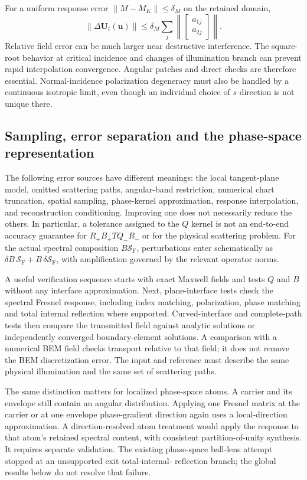 \documentclass[11pt,a4paper]{article}
\newcommand{\vct}[1]{\bm{#1}}
\newcommand{\SF}{\mathcal S_{\mathrm F}}
\numberwithin{equation}{section}
\begin{document}
For a uniform response error $\|M-M_K\|\le\delta_M$ on the retained domain,
\begin{equation}
 \|\Delta\vct U_t(\vct u)\|\le
 \delta_M\sum_j\left\|\begin{bmatrix}a_{1j}\\a_{2j}\end{bmatrix}\right\|.
 \label{eq:interpbound}
\end{equation}
Relative field error can be much larger near destructive interference.
The square-root behavior at critical incidence and changes of illumination
branch can prevent rapid interpolation convergence. Angular patches and direct
checks are therefore essential. Normal-incidence polarization degeneracy must
also be handled by a continuous isotropic limit, even though an individual
choice of $s$ direction is not unique there.

\subsection{Sampling, error separation and the phase-space representation}

The following error sources have different meanings: the local tangent-plane
model, omitted scattering paths, angular-band restriction, numerical chart
truncation, spatial sampling, phase-kernel approximation, response
interpolation, and reconstruction conditioning. Improving one does not
necessarily reduce the others. In particular, a tolerance assigned to the $Q$
kernel is not an end-to-end accuracy guarantee for $R_+B_+TQ_-R_-$ or for the physical
scattering problem. For the actual spectral composition $B\SF$, perturbations
enter schematically as $\delta B\,\SF+B\,\delta\SF$, with amplification governed
by the relevant operator norms.

A useful verification sequence starts with exact Maxwell fields and tests
$Q$ and $B$ without any interface approximation. Next, plane-interface tests
check the spectral Fresnel response, including index matching, polarization,
phase matching and total internal reflection where supported. Curved-interface
and complete-path tests then compare the transmitted field against analytic
solutions or independently converged boundary-element solutions. A comparison
with a numerical BEM field checks transport relative to that field; it does
not remove the BEM discretization error. The input and reference must describe
the same physical illumination and the same set of scattering paths.

The same distinction matters for localized phase-space atoms. A carrier and
its envelope still contain an angular distribution. Applying one Fresnel
matrix at the carrier or at one envelope phase-gradient direction again uses
a local-direction approximation. A direction-resolved atom treatment would
apply the response to that atom's retained spectral content, with consistent
partition-of-unity synthesis. It requires separate validation. The existing
phase-space ball-lens attempt stopped at an unsupported exit total-internal-
reflection branch; the global results below do not resolve that failure.
\end{document}
